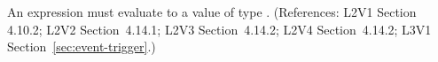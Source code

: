 An \Event {} expression must evaluate to a value of type
.  (References: L2V1 Section 4.10.2; L2V2 Section~4.14.1;
L2V3 Section~4.14.2; L2V4 Section~4.14.2; L3V1 Section~\ref{sec:event-trigger}.)
